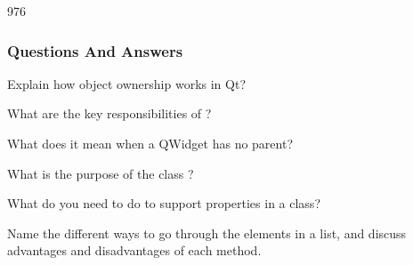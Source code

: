 \begin{slide}[fragile]{976}
  \frametitle{Questions And Answers}\label{parentChildQuestions}
  \begin{questionize}
  \item Explain how object ownership works in Qt?
  \item What are the key responsibilities of ?
  \item What does it mean when a QWidget has no parent?
  \item What is the purpose of the class ?
  \item What do you need to do to support properties in a class?
  \item Name the different ways to go through the elements in a list, and discuss
    advantages and disadvantages of each method.
 \end{questionize}
\end{slide}
